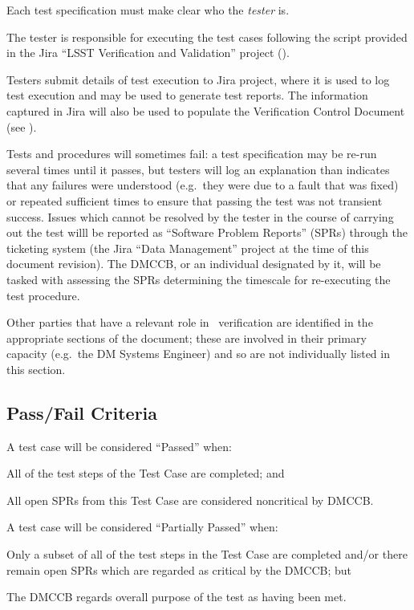 Each test specification must make clear who the \emph{tester} is.

The tester is responsible for executing the test cases following the script provided in the Jira ``LSST Verification and Validation'' project ().

Testers submit details of test execution to Jira project, where it is used to log test execution and may be used to generate test reports.
The information captured in Jira will also be used to populate the Verification Control Document (see ).

Tests and procedures will sometimes fail: a test specification may be re-run several times until it passes, but testers will log an explanation than indicates that any failures were understood (e.g.\ they were due to a fault that was fixed) or repeated sufficient times to ensure that passing the test was not transient success.
Issues which cannot be resolved by the tester in the course of carrying out the test willl be reported as ``Software Problem Reports'' (SPRs) through the \product{} ticketing system (the Jira ``Data Management'' project at the time of this document revision).
The DMCCB, or an individual designated by it, will be tasked with assessing the SPRs determining the timescale for re-executing the test procedure.

Other parties that have a relevant role in \product\ verification are identified in the appropriate sections of the document; these are involved in their primary capacity (e.g.\ the DM Systems Engineer) and so are not individually listed in this section.

\subsection{Pass/Fail Criteria}

A test case will be considered ``Passed'' when:

\begin{itemize_single}
\item{All of the test steps of the Test Case are completed; and}
\item{All open SPRs from this Test Case are considered noncritical by DMCCB.}
\end{itemize_single}

A test case will be considered ``Partially Passed'' when:

\begin{itemize_single}
\item{Only a subset of all of the test steps in the Test Case are completed and/or there remain open SPRs which are regarded as critical by the DMCCB; but}
\item{The DMCCB regards overall purpose of the test as having been met.}
\end{itemize_single}

